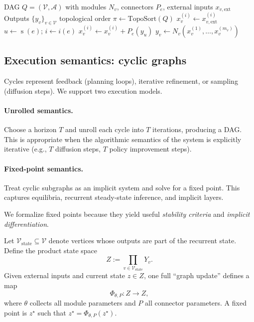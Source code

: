 \documentclass[11pt]{article}
\theoremstyle{definition}
\theoremstyle{plain}
\theoremstyle{remark}
\newcommand{\mc}[1]{\mathcal{#1}}
\newcommand{\Nodes}{\mc{V}}
\newcommand{\Edges}{\mc{A}}
\newcommand{\src}{\operatorname{s}}
\newcommand{\tgt}{\operatorname{t}}
\begin{document}
\begin{algorithm}[t]
\caption{Evaluate a decorated quiver (DAG case)}
\label{alg:eval-dag}
\begin{algorithmic}[1]
\Require DAG $Q=(\Nodes,\Edges)$ with modules $N_v$, connectors $P_e$, external inputs $x_{v,\mathrm{ext}}$
\Ensure Outputs $\{y_v\}_{v\in\Nodes}$
\State topological order $\pi \gets \mathrm{TopoSort}(Q)$
    \State $x_v^{(i)} \gets x_{v,\mathrm{ext}}^{(i)}$
  \EndFor
  \For{edge $e$ with $\tgt(e)=v$}
    \State $u \gets \src(e)$; $i\gets i(e)$
    \State $x_v^{(i)} \gets x_v^{(i)} + P_e(y_u)$
  \EndFor
  \State $y_v \gets N_v(x_v^{(1)},\dots,x_v^{(m_v)})$
\EndFor
\end{algorithmic}
\end{algorithm}

\subsection{Execution semantics: cyclic graphs}
\label{sec:cycles}

Cycles represent feedback (planning loops), iterative refinement, or sampling (diffusion steps).
We support two execution models.

\paragraph{Unrolled semantics.}
Choose a horizon $T$ and unroll each cycle into $T$ iterations, producing a DAG.
This is appropriate when the algorithmic semantics of the system is explicitly iterative (e.g., $T$ diffusion steps, $T$ policy improvement steps).

\paragraph{Fixed-point semantics.}
Treat cyclic subgraphs as an implicit system and solve for a fixed point.
This captures equilibria, recurrent steady-state inference, and implicit layers.

We formalize fixed points because they yield useful \emph{stability criteria} and \emph{implicit differentiation}.

Let $\Nodes_\mathrm{state}\subseteq\Nodes$ denote vertices whose outputs are part of the recurrent state.
Define the product state space
\[
Z := \prod_{v\in \Nodes_\mathrm{state}} Y_v.
\]
Given external inputs and current state $z\in Z$, one full ``graph update'' defines a map
\[
\Phi_{\theta,P}: Z \to Z,
\]
where $\theta$ collects all module parameters and $P$ all connector parameters.
A fixed point is $z^\star$ such that $z^\star=\Phi_{\theta,P}(z^\star)$.
\end{document}
